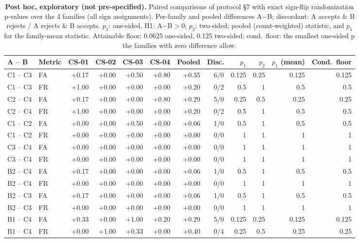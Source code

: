 \begin{table}[t]\centering\scriptsize
\caption{\textbf{Post hoc, exploratory (not pre-specified).} Paired comparisons of protocol \S7 with exact sign-flip randomization p-values over the 4 families (all sign assignments). Per-family and pooled differences A$-$B; discordant: A accepts \& B rejects / A rejects \& B accepts. $p_1$: one-sided, H1: A$-$B$>0$; $p_2$: two-sided; pooled (count-weighted) statistic, and $p_1$ for the family-mean statistic. Attainable floor: 0.0625 one-sided, 0.125 two-sided; cond.\ floor: the smallest one-sided p the families with zero difference allow.}\label{tab:expl-paired}
\begin{tabular}{llrrrrrrrrrr}\toprule A -- B & Metric & CS-01 & CS-02 & CS-03 & CS-04 & Pooled & Disc. & $p_1$ & $p_2$ & $p_1$ (mean) & Cond.\ floor \\\midrule
C1 -- C3 & FA & +0.17 & +0.00 & +0.50 & +0.80 & +0.35 & 6/0 & 0.125 & 0.25 & 0.125 & 0.125 \\
C1 -- C3 & FR & +1.00 & +0.00 & +0.00 & +0.00 & +0.20 & 0/2 & 0.5 & 1 & 0.5 & 0.5 \\
C2 -- C4 & FA & +0.17 & +0.00 & +0.00 & +0.80 & +0.29 & 5/0 & 0.25 & 0.5 & 0.25 & 0.25 \\
C2 -- C4 & FR & +1.00 & +0.00 & +0.00 & +0.00 & +0.20 & 0/2 & 0.5 & 1 & 0.5 & 0.5 \\
C1 -- C2 & FA & +0.00 & +0.00 & +0.50 & +0.00 & +0.06 & 1/0 & 0.5 & 1 & 0.5 & 0.5 \\
C1 -- C2 & FR & +0.00 & +0.00 & +0.00 & +0.00 & +0.00 & 0/0 & 1 & 1 & 1 & 1 \\
C3 -- C4 & FA & +0.00 & +0.00 & +0.00 & +0.00 & +0.00 & 0/0 & 1 & 1 & 1 & 1 \\
C3 -- C4 & FR & +0.00 & +0.00 & +0.00 & +0.00 & +0.00 & 0/0 & 1 & 1 & 1 & 1 \\
B2 -- C4 & FA & +0.17 & +0.00 & +0.00 & +0.00 & +0.06 & 1/0 & 0.5 & 1 & 0.5 & 0.5 \\
B2 -- C4 & FR & +0.00 & +0.00 & +0.00 & +0.00 & +0.00 & 0/0 & 1 & 1 & 1 & 1 \\
B2 -- C3 & FA & +0.17 & +0.00 & +0.00 & +0.00 & +0.06 & 1/0 & 0.5 & 1 & 0.5 & 0.5 \\
B2 -- C3 & FR & +0.00 & +0.00 & +0.00 & +0.00 & +0.00 & 0/0 & 1 & 1 & 1 & 1 \\
B1 -- C4 & FA & +0.33 & +0.00 & +1.00 & +0.20 & +0.29 & 5/0 & 0.125 & 0.25 & 0.125 & 0.125 \\
B1 -- C4 & FR & +0.00 & +1.00 & +0.33 & +0.00 & +0.40 & 0/4 & 0.25 & 0.5 & 0.25 & 0.25 \\
\bottomrule\end{tabular}\end{table}
